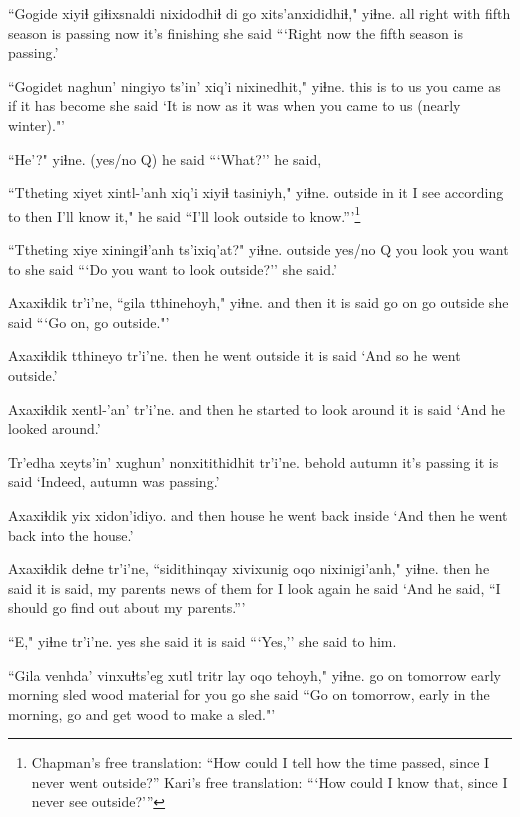\documentclass[12pt]{article}
\begin{document}
\gll ``Gogide xiyiɬ giɬixsnaldi {nixidodhiɬ di} go xits'anxididhiɬ," yiɬne.
{all right} with fifth {season is passing} now {it's finishing}  {she said}
\glt ```Right now the fifth season is passing.'
\glend

\gll ``Gogidet naghun' ningiyo ts'in' xiq'i nixinedhit," yiɬne.
{this is} {to us} {you came} {} {as if} {it has become} {she said}
\glt `It is now as it was when you came to us (nearly winter)."'
\glend

\gll ``He'?" yiɬne. 
{(yes/no Q)} {he said}
\glt ```What?'' he said,
\glend

\gll ``Ttheting xiyet xintl-'anh xiq'i xiyiɬ tasiniyh," yiɬne.
outside {in it} {I see} {according to} then {I'll know it,"} {he said}
\glt ``I'll look outside to know.'''\footnote{Chapman's free translation:  ``How could I tell how the time passed, since I never went outside?'' Kari's free translation:  ```How could I know that, since I never see outside?'''}
\glend

\gll ``Ttheting xiye xiningiɬ'anh ts'ixiq'at?" yiɬne.
outside {yes/no Q} {you look} {you want to} {she said}
\glt ```Do you want to look outside?'' she said.'
\glend

\gll Axaxiɬdik tr'i'ne, ``gila  tthinehoyh," yiɬne.
{and then} {it is said} {go on} {go outside} {she said}
\glt ```Go on, go outside."'
\glend

\gll Axaxiɬdik tthineyo tr'i'ne.
then  {he went outside} {it is said}
\glt `And so he went outside.'
\glend

\gll Axaxiɬdik xentl-'an' tr'i'ne.
{and then} {he started to look around} {it is said}
\glt `And he looked around.'
\glend

\gll Tr'edha xeyts'in' {xughun' nonxitithidhit} tr'i'ne.
behold  autumn  {it's passing}  {it is said}
\glt `Indeed, autumn was passing.'
\glend

\gll Axaxiɬdik yix xidon'idiyo.
{and then} house {he went back inside}
\glt `And then he went back into the house.'
\glend

\gll Axaxiɬdik deɬne tr'i'ne, ``sidithinqay xivixunig oqo nixinigi'anh," yiɬne.
then {he said} {it is said,} {my parents} {news of them} for {I look again} {he said}
\glt `And he said, ``I should go find out about my parents.'''
\glend

\gll ``E," yiɬne  tr'i'ne. 
yes  {she said} {it is said} 
\glt ```Yes,'' she said to him. 
\glend

\gll ``Gila venhda' vinxuɬts'eg  xutl tritr lay  oqo tehoyh," yiɬne.
{go on} tomorrow {early morning} sled wood material for {you go} {she said}
\glt ``Go on tomorrow, early in the morning, go and get wood to make a sled."'
\glend
\end{document}
